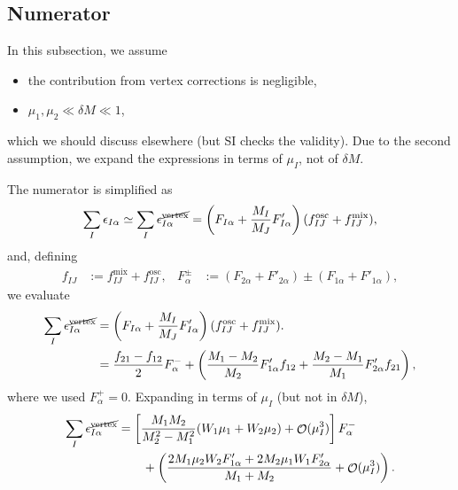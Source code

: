 \documentclass[a4paper,11pt,captions=tableheading,DIV=12]{scrartcl}
\numberwithin{equation}{section}
\DeclareMathOperator{\Order}{\mathcal{O}}
\begin{document}
\subsection{Numerator}
In this subsection, we assume
\begin{itemize}
 \item the contribution from vertex corrections is negligible,
 \item $\mu_1, \mu_2 \ll \delta M \ll 1$,
\end{itemize}
which we should discuss elsewhere (but SI checks the validity).
Due to the second assumption, we expand the expressions in terms of $\mu_I$, not of $\delta M$.

The numerator is simplified as
\begin{align}
  \sum_I\epsilon_{I\alpha}
\simeq
  \sum_I\epsilon^{\cancel{\text{vertex}}}_{I\alpha}
=
\left(
F_{I\alpha} + \frac{M_I}{M_J}F'_{I\alpha}
\right)(f^{\mathrm{osc}}_{IJ} + f^{\mathrm{mix}}_{IJ}),
\end{align}
and, defining
\begin{align}
 f_{IJ}&:=f_{IJ}^{\mathrm{mix}} + f_{IJ}^{\mathrm{osc}},
&
 F^{\pm}_\alpha &:= (F_{2\alpha}+F'_{2\alpha})\pm(F_{1\alpha}+F'_{1\alpha}),
\end{align}
we evaluate
\begin{align}
 \sum_I\epsilon^{\cancel{\text{vertex}}}_{I\alpha}
&=
\left(
F_{I\alpha} + \frac{M_I}{M_J}F'_{I\alpha}
\right)(f^{\mathrm{osc}}_{IJ} + f^{\mathrm{mix}}_{IJ}).
\\&=
\frac{f_{21}-f_{12}}{2}F_\alpha^-
+ \left(\frac{M_1-M_2}{M_2}F'_{1\alpha}f_{12} + \frac{M_2-M_1}{M_1}F'_{2\alpha}f_{21}\right),
\end{align}
where we used $F_\alpha^+=0$.
Expanding in terms of $\mu_I$ (but not in $\delta M$),
\begin{align}
\begin{split}
  \sum_I\epsilon^{\cancel{\text{vertex}}}_{I\alpha}
 &=
  \left[
 \frac{M_1 M_2}{M_2^2-M_1^2}(W_1\mu_1+W_2\mu_2) + \Order(\mu_I^3)
  \right]F^-_{\alpha}\\
 &\qquad+
\left(
\frac{2M_1\mu_2W_2F'_{1\alpha} + 2M_2\mu_1W_1F'_{2\alpha}}{M_1+M_2} + \Order(\mu_I^3)
\right).
\end{split}\label{eq:1}
\end{align}
\end{document}
